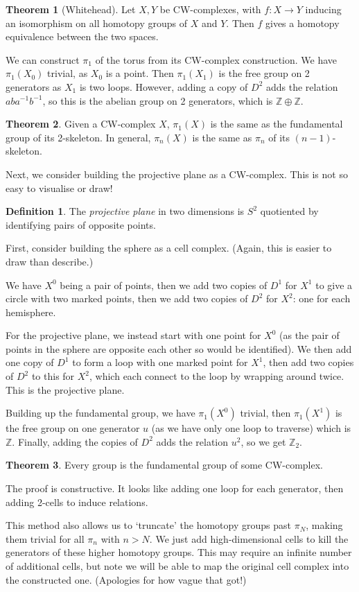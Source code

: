 \documentclass[a4paper,12pt]{article}
\newcommand{\ZZ}{\mathbb{Z}}
\newcommand{\ZZ}{\mathbb{Z}}
\theoremstyle{definition}
\newtheorem*{thm}{Theorem}
\newtheorem*{defn}{Definition}
\begin{document}
\begin{thm}[Whitehead]
	Let $X, Y$ be CW-complexes, with $f: X\to Y$ inducing an isomorphism on all homotopy groups of $X$ and $Y$.
	Then $f$ gives a homotopy equivalence between the two spaces.
\end{thm}

We can construct $\pi_1$ of the torus from its CW-complex construction.
We have $\pi_1(X_0)$ trivial, as $X_0$ is a point.
Then $\pi_1(X_1)$ is the free group on 2 generators as $X_1$ is two loops.
However, adding a copy of $D^2$ adds the relation $aba^{-1}b^{-1}$, so this is the abelian group on 2 generators, which is $\ZZ\oplus\ZZ$. 

\begin{thm}
	Given a CW-complex $X$, $\pi_1(X)$ is the same as the fundamental group of its 2-skeleton.
	In general, $\pi_n(X)$ is the same as $\pi_n$ of its $(n-1)$-skeleton.
\end{thm}

Next, we consider building the projective plane as a CW-complex.
This is not so easy to visualise or draw!

\begin{defn}
The \emph{projective plane} in two dimensions is $S^2$ quotiented by identifying pairs of opposite points.
\end{defn}

First, consider building the sphere as a cell complex.
(Again, this is easier to draw than describe.)

We have $X^0$ being a pair of points, then we add two copies of $D^1$ for $X^1$ to give a circle with two marked points, then we add two copies of $D^2$ for $X^2$: one for each hemisphere.

For the projective plane, we instead start with one point for $X^0$ (as the pair of points in the sphere are opposite each other so would be identified).
We then add one copy of $D^1$ to form a loop with one marked point for $X^1$, then add two copies of $D^2$ to this for $X^2$, which each connect to the loop by wrapping around twice.
This is the projective plane.

Building up the fundamental group, we have $\pi_1(X^0)$ trivial, then $\pi_1(X^1)$ is the free group on one generator $u$ (as we have only one loop to traverse) which is $\ZZ$.
Finally, adding the copies of $D^2$ adds the relation $u^2$, so we get $\ZZ_2$.

\begin{thm}
Every group is the fundamental group of some CW-complex.
\end{thm}

The proof is constructive. It looks like adding one loop for each generator, then adding 2-cells to induce relations.

This method also allows us to `truncate' the homotopy groups past $\pi_N$, making them trivial for all $\pi_n$ with $n > N$.
We just add high-dimensional cells to kill the generators of these higher homotopy groups.
This may require an infinite number of additional cells, but note we will be able to map the original cell complex into the constructed one.
(Apologies for how vague that got!)
\end{document}
